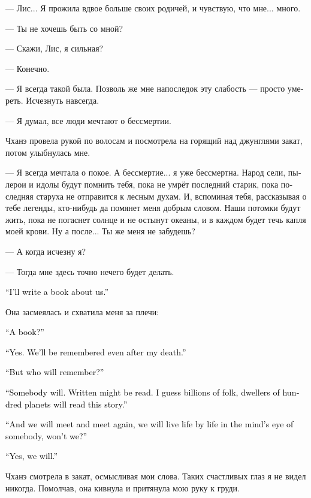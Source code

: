 \documentclass[a4paper,12pt,fleqn]{book}\usepackage{cooltooltips}\usepackage{polyglossia}\setdefaultlanguage[babelshorthands=true]{russian}\setotherlanguage{english}\defaultfontfeatures{Ligatures=TeX,Mapping=tex-text} \usepackage{xcolor}\definecolor{lightgray}{HTML}{bbbbbb}\color{lightgray}\newcommand{\ml}[3]{\textenglish{\textcolor{black}{#3}}}
\begin{document}
{--- Лис...
Я прожила вдвое больше своих родичей, и чувствую, что мне... много.

--- Ты не хочешь быть со мной?

--- Скажи, Лис, я сильная?

--- Конечно.

--- Я всегда такой была.
Позволь же мне напоследок эту слабость --- просто умереть.
Исчезнуть навсегда.

--- Я думал, все люди мечтают о бессмертии.

Чханэ провела рукой по волосам и посмотрела на горящий над джунглями закат, потом улыбнулась мне.

--- Я всегда мечтала о покое.
А бессмертие... я уже бессмертна.
Народ сели, пылерои и идолы будут помнить тебя, пока не умрёт последний старик, пока последняя старуха не отправится к лесным духам.
И, вспоминая тебя, рассказывая о тебе легенды, кто-нибудь да помянет меня добрым словом.
Наши потомки будут жить, пока не погаснет солнце и не остынут океаны, и в каждом будет течь капля моей крови.
Ну а после...
Ты же меня не забудешь?

--- А когда исчезну я?

--- Тогда мне здесь точно нечего будет делать.

\ml{$0$}
{--- Я напишу о нас книгу.}
{``I'll write a book about us.''}

Она засмеялась и схватила меня за плечи:

\ml{$0$}
{--- Книгу?}
{``A book?''}

\ml{$0$}
{--- Да.}
{``Yes.}
\ml{$0$}
{И нас будут помнить даже после моей гибели.}
{We'll be remembered even after my death.''}

\ml{$0$}
{--- Кто?}
{``But who will remember?''}

\ml{$0$}
{--- Кто-то да будет.}
{``Somebody will.}
\ml{$0$}
{Написанное может быть прочитано.}
{Written might be read.}
\ml{$0$}
{Может быть, её будут читать миллиарды, жители сотни планет.}
{I guess billions of folk, dwellers of hundred planets will read this story.''}

\ml{$0$}
{--- И мы будем встречаться снова и снова, проживать жизнь за жизнью в чьём-то воображении?}
{``And we will meet and meet again, we will live life by life in the mind's eye of somebody, won't we?''}

\ml{$0$}
{--- Да.}
{``Yes, we will.''}

Чханэ смотрела в закат, осмысливая мои слова.
Таких счастливых глаз я не видел никогда.
Помолчав, она кивнула и притянула мою руку к груди.

}
\end{document}
